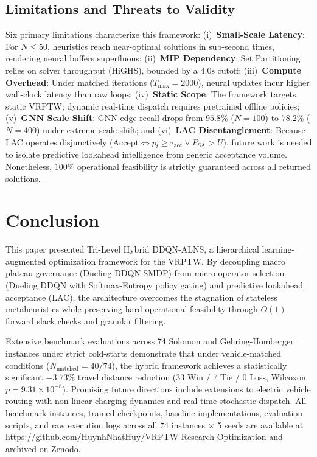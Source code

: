 \documentclass{ieeeaccess}
\begin{document}
\subsection{Limitations and Threats to Validity}
\label{sec:disc_limitations}
Six primary limitations characterize this framework: (i)~\textbf{Small-Scale Latency}: For $N \le 50$, heuristics reach near-optimal solutions in sub-second times, rendering neural buffers superfluous; (ii)~\textbf{MIP Dependency}: Set Partitioning relies on solver throughput (HiGHS), bounded by a $4.0\text{s}$ cutoff; (iii)~\textbf{Compute Overhead}: Under matched iterations ($T_{\max}=2000$), neural updates incur higher wall-clock latency than raw loops; (iv)~\textbf{Static Scope}: The framework targets static VRPTW; dynamic real-time dispatch requires pretrained offline policies; (v)~\textbf{GNN Scale Shift}: GNN edge recall drops from $95.8\%$ ($N=100$) to $78.2\%$ ($N=400$) under extreme scale shift; and (vi)~\textbf{LAC Disentanglement}: Because LAC operates disjunctively ($\text{Accept} \iff p_t \ge \tau_{\text{acc}} \lor P_{\text{SA}} > U$), future work is needed to isolate predictive lookahead intelligence from generic acceptance volume. Nonetheless, $100\%$ operational feasibility is strictly guaranteed across all returned solutions.

\section{Conclusion}
\label{sec:conclusion}
This paper presented Tri-Level Hybrid DDQN-ALNS, a hierarchical learning-augmented optimization framework for the VRPTW. By decoupling macro plateau governance (Dueling DDQN SMDP) from micro operator selection (Dueling DDQN with Softmax-Entropy policy gating) and predictive lookahead acceptance (LAC), the architecture overcomes the stagnation of stateless metaheuristics while preserving hard operational feasibility through $O(1)$ forward slack checks and granular filtering. 

Extensive benchmark evaluations across 74 Solomon and Gehring-Homberger instances under strict cold-starts demonstrate that under vehicle-matched conditions ($N_{\text{matched}}=40/74$), the hybrid framework achieves a statistically significant $-3.73\%$ travel distance reduction (33 Win / 7 Tie / 0 Loss, Wilcoxon $p=9.31 \times 10^{-8}$). Promising future directions include extensions to electric vehicle routing with non-linear charging dynamics and real-time stochastic dispatch. All benchmark instances, trained checkpoints, baseline implementations, evaluation scripts, and raw execution logs across all 74 instances $\times$ 5 seeds are available at \url{https://github.com/HuynhNhatHuy/VRPTW-Research-Optimization} and archived on Zenodo.
\end{document}
